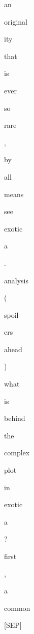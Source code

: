 \documentclass[varwidth=150mm]{standalone}
\begin{document}
\begin{CJK*}{UTF8}{gbsn}
{{{\colorbox{red!1.6801187992095947}{\strut an} \colorbox{red!0.0}{\strut original}\colorbox{red!0.0}{\strut ity} \colorbox{red!0.0}{\strut that} \colorbox{red!0.0}{\strut is} \colorbox{red!0.0}{\strut ever} \colorbox{red!0.0}{\strut so} \colorbox{red!0.0}{\strut rare} \colorbox{red!0.0}{\strut ,} \colorbox{red!0.0}{\strut by} \colorbox{red!1.0623191595077515}{\strut all} \colorbox{red!0.0}{\strut means} \colorbox{red!2.148472309112549}{\strut see} \colorbox{red!24.80916404724121}{\strut exotic}\colorbox{red!4.788603782653809}{\strut a} \colorbox{red!1.2857834100723267}{\strut .} \colorbox{red!16.053430557250977}{\strut analysis} \colorbox{red!6.30006742477417}{\strut (} \colorbox{red!5.265573024749756}{\strut *} \colorbox{red!6.395326614379883}{\strut *} \colorbox{red!3.005366086959839}{\strut spoil}\colorbox{red!1.4325087070465088}{\strut ers} \colorbox{red!33.089019775390625}{\strut *} \colorbox{red!22.294570922851562}{\strut *} \colorbox{red!3.355860471725464}{\strut ahead} \colorbox{red!3.459627151489258}{\strut )} \colorbox{red!5.555118560791016}{\strut what} \colorbox{red!1.6057276725769043}{\strut is} \colorbox{red!2.4737045764923096}{\strut behind} \colorbox{red!4.278401851654053}{\strut the} \colorbox{red!1.7540236711502075}{\strut complex} \colorbox{red!2.207653045654297}{\strut plot} \colorbox{red!2.9674270153045654}{\strut in} \colorbox{red!47.65864562988281}{\strut exotic}\colorbox{red!100.0}{\strut a} \colorbox{red!7.631637096405029}{\strut ?} \colorbox{red!46.22245407104492}{\strut first} \colorbox{red!2.957778215408325}{\strut ,} \colorbox{red!2.2554304599761963}{\strut a} \colorbox{red!2.043318271636963}{\strut common} \colorbox{red!2.7034506797790527}{\strut [SEP]}
}}}
\end{CJK*}
\end{document}
